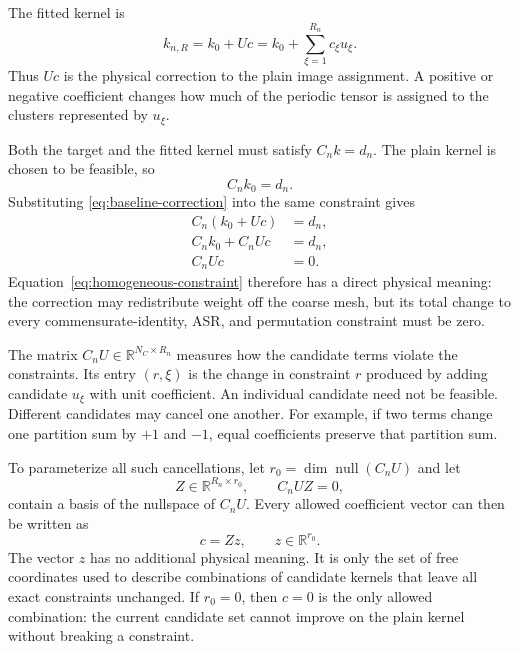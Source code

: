 \documentclass{article}
\begin{document}
The fitted kernel is
\begin{equation}
    k_{n,R}=k_0+Uc
    =k_0+\sum_{\xi=1}^{R_n}c_\xi u_\xi.
    \label{eq:baseline-correction}
\end{equation}
Thus $Uc$ is the physical correction to the plain image assignment. A
positive or negative coefficient changes how much of the periodic tensor is
assigned to the clusters represented by $u_\xi$.

Both the target and the fitted kernel must satisfy
$C_nk=d_n$. The plain kernel is chosen to be feasible, so
\begin{equation}
    C_nk_0=d_n.
    \label{eq:plain-kernel-feasible}
\end{equation}
Substituting \autoref{eq:baseline-correction} into the same constraint gives
\begin{align}
    C_n(k_0+Uc)&=d_n,\nonumber\\
    C_nk_0+C_nUc&=d_n,\nonumber\\
    C_nUc&=0.
    \label{eq:homogeneous-constraint}
\end{align}
Equation~\eqref{eq:homogeneous-constraint} therefore has a direct physical
meaning: the correction may redistribute weight off the coarse mesh, but
its total change to every commensurate-identity, ASR, and permutation
constraint must be zero.

The matrix $C_nU\in\mathbb R^{N_C\times R_n}$ measures how the candidate
terms violate the constraints. Its entry $(r,\xi)$ is the change in
constraint $r$ produced by adding candidate $u_\xi$ with unit coefficient.
An individual candidate need not be feasible. Different candidates may
cancel one another. For example, if two terms change one partition sum by
$+1$ and $-1$, equal coefficients preserve that partition sum.

To parameterize all such cancellations, let
$r_0=\dim\operatorname{null}(C_nU)$ and let
\begin{equation}
    Z\in\mathbb R^{R_n\times r_0},
    \qquad C_nUZ=0,
    \label{eq:nullspace-basis}
\end{equation}
contain a basis of the nullspace of $C_nU$. Every allowed coefficient
vector can then be written as
\begin{equation}
    c=Zz,
    \qquad z\in\mathbb R^{r_0}.
    \label{eq:nullspace-coordinates}
\end{equation}
The vector $z$ has no additional physical meaning. It is only the set of
free coordinates used to describe combinations of candidate kernels that
leave all exact constraints unchanged. If $r_0=0$, then $c=0$ is the only
allowed combination: the current candidate set cannot improve on the plain
kernel without breaking a constraint.
\end{document}
